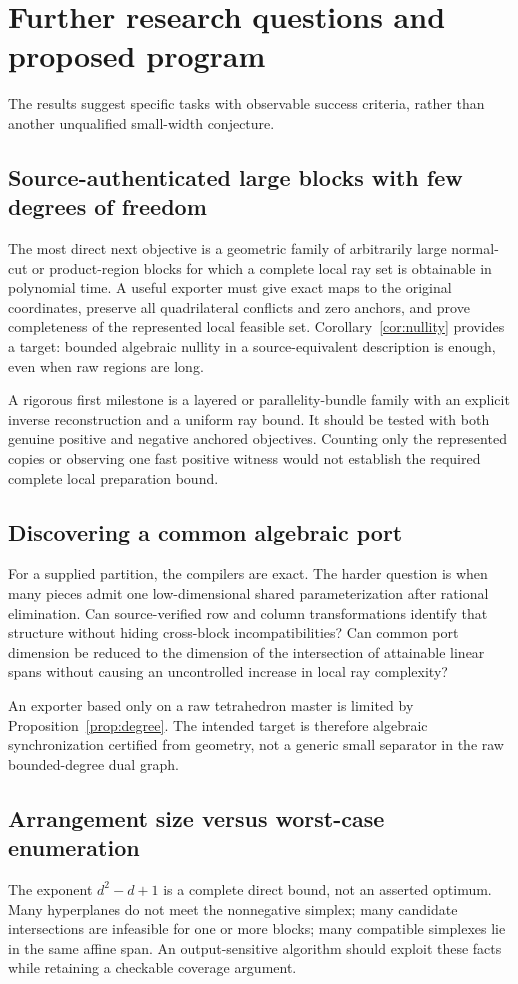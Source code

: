 \section{Further research questions and proposed program}
\label{sec:future}
The results suggest specific tasks with observable success criteria, rather than another unqualified small-width conjecture.

\subsection{Source-authenticated large blocks with few degrees of freedom}
The most direct next objective is a geometric family of arbitrarily large normal-cut or product-region blocks for which a complete local ray set is obtainable in polynomial time. A useful exporter must give exact maps to the original coordinates, preserve all quadrilateral conflicts and zero anchors, and prove completeness of the represented local feasible set. Corollary~\ref{cor:nullity} provides a target: bounded algebraic nullity in a source-equivalent description is enough, even when raw regions are long.

A rigorous first milestone is a layered or parallelity-bundle family with an explicit inverse reconstruction and a uniform ray bound. It should be tested with both genuine positive and negative anchored objectives. Counting only the represented copies or observing one fast positive witness would not establish the required complete local preparation bound.

\subsection{Discovering a common algebraic port}
For a supplied partition, the compilers are exact. The harder question is when many pieces admit one low-dimensional shared parameterization after rational elimination. Can source-verified row and column transformations identify that structure without hiding cross-block incompatibilities? Can common port dimension be reduced to the dimension of the intersection of attainable linear spans without causing an uncontrolled increase in local ray complexity?

An exporter based only on a raw tetrahedron master is limited by Proposition~\ref{prop:degree}. The intended target is therefore algebraic synchronization certified from geometry, not a generic small separator in the raw bounded-degree dual graph.

\subsection{Arrangement size versus worst-case enumeration}
The exponent $d^2-d+1$ is a complete direct bound, not an asserted optimum. Many hyperplanes do not meet the nonnegative simplex; many candidate intersections are infeasible for one or more blocks; many compatible simplexes lie in the same affine span. An output-sensitive algorithm should exploit these facts while retaining a checkable coverage argument.


